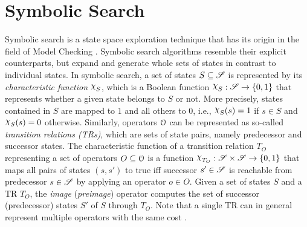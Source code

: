 \section{Symbolic Search}
Symbolic search is a state space exploration technique that has its origin in
the field of Model Checking \autocite{mcmillan-1993}. Symbolic search algorithms resemble
their explicit counterparts, but expand and generate whole sets of states in contrast to individual states.
In symbolic search, a set of states $S \subseteq \mathscr S$ is represented by its \emph{characteristic function}
$\charf_S$, which is a Boolean function $\charf_S : \states \to \{0,1\}$ that represents whether a given
state belongs to $S$ or not.
More precisely, states contained in $S$ are mapped to $1$ and all others to $0$, i.e., $\charf_S(s) = 1$ if $s \in S$ and $\charf_S(s) = 0$ otherwise.
Similarly, operators $\mathcal O$ can be represented as so-called \emph{transition relations (TRs)}, which are sets of state pairs, namely predecessor and successor states. The characteristic function of a transition relation $T_O$ representing a set of operators $O \subseteq \mathcal O$ is a function $\charf_{T_O}: \states \times \states \to \{ 0,1\}$ that maps all pairs of states $(s,s')$ to true iff successor $s' \in \mathscr S$ is reachable from predecessor $s \in \mathscr S$ by applying an operator $o \in O$. Given a set of states $S$ and a TR $T_O$, the \emph{image} (\emph{preimage}) operator computes the set of successor (predecessor) states $S'$ of $S$ through $T_O$.
Note that a single TR can in general represent multiple operators with the same cost \autocite{torralba-et-al-icaps2013,torralba-et-al-aij2017}.

